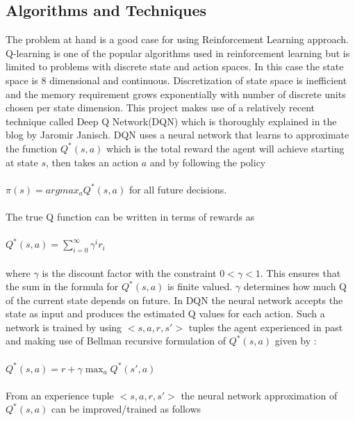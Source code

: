 \documentclass{article}
\begin{document}
\subsection*{Algorithms and Techniques}
The problem at hand is a good case for using Reinforcement Learning approach. Q-learning\cite{Qlearn} is one of the popular algorithms used in reinforcement learning but is limited to problems with discrete state and action spaces. In this case the state space is 8 dimensional and continuous. Discretization of state space is inefficient and the memory requirement grows exponentially with number of discrete units chosen per state dimension. This project makes use of a relatively recent technique called Deep Q Network(DQN)\cite{DQN} which is thoroughly explained in the blog by Jaromir Janisch\cite{Jaromir}. DQN uses a neural network that learns to approximate the function 
$Q^*(s, a)$ which is the total reward the agent will achieve starting at state $s$, then takes an action $a$ and by following the policy\\\\$\pi(s) = argmax_a Q^*(s, a)$ for all future decisions.\\\\
The true Q function can be written in terms of rewards as\\\\$Q^*(s, a) = \sum_{i=0}^{\infty} \gamma^i r_i$\\\\ where $\gamma$ is the discount factor with the constraint $0 < \gamma < 1$. This ensures that the sum in the formula for $Q^*(s, a)$ is finite valued. $\gamma$ determines how much Q of the current state depends on future. In DQN the neural network accepts the state as input and produces the estimated Q values for each action. Such a network is trained by using $<s, a, r, s'>$ tuples the agent experienced in past and making use of Bellman recursive formulation of $Q^*(s, a)$ given by :\\\\
$Q^*(s, a) = r + \gamma \max_a Q^*(s', a)$\\\\
From an experience tuple $<s, a, r, s'>$ the neural network approximation of $Q^*(s,a)$ can be improved/trained as follows
\vspace{-0.09cm}
\end{document}
